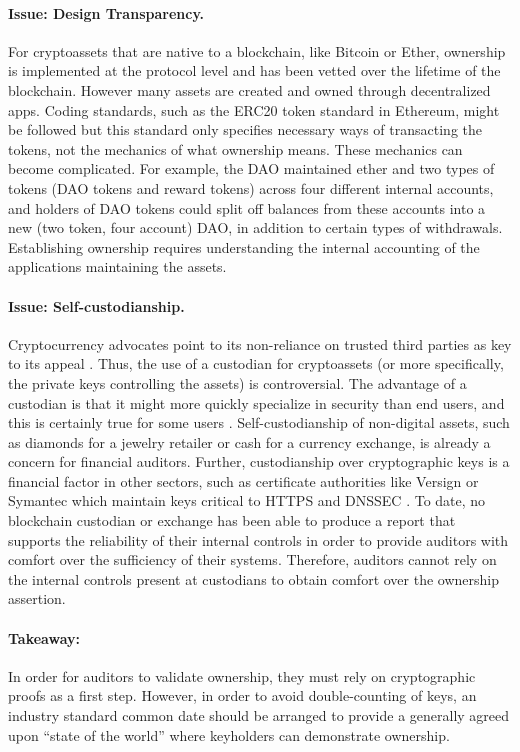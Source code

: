 \paragraph{Issue: Design Transparency.} For cryptoassets that are native to a blockchain, like Bitcoin or Ether, ownership is implemented at the protocol level and has been vetted over the lifetime of the blockchain. However many assets are created and owned through decentralized apps. Coding standards, such as the ERC20 token standard in Ethereum, might be followed but this standard only specifies necessary ways of transacting the tokens, not the mechanics of what ownership means. These mechanics can become complicated. For example, the DAO maintained ether and two types of tokens (DAO tokens and reward tokens) across four different internal accounts, and holders of DAO tokens could split off balances from these accounts into a new (two token, four account) DAO, in addition to certain types of withdrawals. Establishing ownership requires understanding the internal accounting of the applications maintaining the assets. 

\paragraph{Issue: Self-custodianship.} Cryptocurrency advocates point to its non-reliance on trusted third parties as key to its appeal . Thus, the use of a custodian for cryptoassets (or more specifically, the private keys controlling the assets) is controversial. The advantage of a custodian is that it might more quickly specialize in security than end users, and this is certainly true for some users . Self-custodianship of non-digital assets, such as diamonds for a jewelry retailer or cash for a currency exchange, is already a concern for financial auditors. Further, custodianship over cryptographic keys is a financial factor in other sectors, such as certificate authorities like Versign or Symantec which maintain keys critical to HTTPS and DNSSEC \todo{[cite]}. To date, no blockchain custodian or exchange has been able to produce a report that supports the reliability of their internal controls in order to provide auditors with comfort over the sufficiency of their systems. Therefore, auditors cannot rely on the internal controls present at custodians to obtain comfort over the ownership assertion. 

\paragraph{Takeaway:} In order for auditors to validate ownership, they must rely on cryptographic proofs as a first step. However, in order to avoid double-counting of keys, an industry standard common date should be arranged to provide a generally agreed upon ``state of the world'' where keyholders can demonstrate ownership. 


